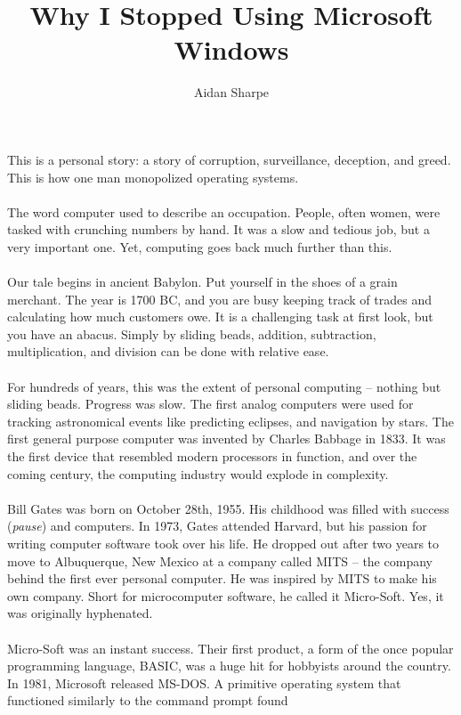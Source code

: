 \documentclass[11pt]{article}
\title{Why I Stopped Using Microsoft Windows}
\author{Aidan Sharpe}
\begin{document}
\maketitle

This is a personal story: a story of corruption, surveillance, deception, and greed. This is 
how one man monopolized operating systems.
\\
\\
The word computer used to describe an occupation. People, often women, were tasked with 
crunching numbers by hand. It was a slow and tedious job, but a very important one. Yet, 
computing goes back much further than this.
\\
\\
Our tale begins in ancient Babylon. Put yourself in the shoes of a grain merchant. 
The year is 1700 BC, and you are busy keeping track of trades and calculating how much 
customers owe. It is a challenging task at first look, but you have an abacus. Simply by 
sliding beads, addition, subtraction, multiplication, and division can be done with relative 
ease.
\\
\\
For hundreds of years, this was the extent of personal computing -- nothing but sliding beads. 
Progress was slow. The first analog computers were used for tracking astronomical events 
like predicting eclipses, and navigation by stars. The first general purpose computer was 
invented by Charles Babbage in 1833. It was the first device that resembled modern processors 
in function, and over the coming century, the computing industry would explode in complexity.
\\
\\
 Bill Gates was born on October 28th, 1955. His childhood was
filled with success (\textit{pause}) and computers. In 1973, Gates attended Harvard, but his
passion for writing computer software took over his life. He dropped out after two years to
move to Albuquerque, New Mexico at a company called MITS -- the company behind the first ever
personal computer. He was inspired by MITS to make his own company. Short for microcomputer 
software, he called it Micro-Soft. Yes, it was originally hyphenated.
\\
\\
Micro-Soft was an instant success. Their first product, a form of the once popular programming
language, BASIC, was a huge hit for hobbyists around the country. In 1981, Microsoft released
MS-DOS. A primitive operating system that functioned similarly to the command prompt found
\end{document}
